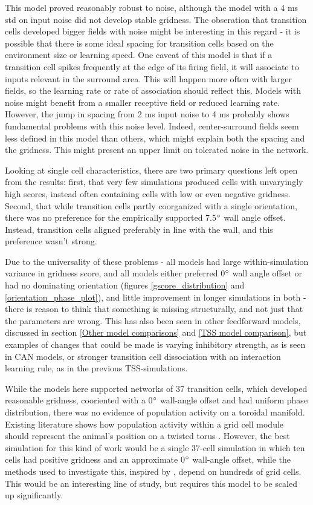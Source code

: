 \documentclass{article}
\begin{document}
    This model proved reasonably robust to noise, although the model with a 4 ms std on input noise did not develop stable gridness. The obseration that transition cells developed bigger fields with noise might be interesting in this regard - it is possible that there is some ideal spacing for transition cells based on the environment size or learning speed. One caveat of this model is that if a transition cell spikes frequently at the edge of its firing field, it will associate to inputs relevant in the surround area. This will happen more often with larger fields, so the learning rate or rate of association should reflect this. Models with noise might benefit from a smaller receptive field or reduced learning rate. However, the jump in spacing from 2 ms input noise to 4 ms probably shows fundamental problems with this noise level. Indeed, center-surround fields seem less defined in this model than others, which might explain both the spacing and the gridness. This might present an upper limit on tolerated noise in the network.

    Looking at single cell characteristics, there are two primary questions left open from the results: first, that very few simulations produced cells with unvaryingly high scores, instead often containing cells with low or even negative gridness. Second, that while transition cells partly coorganized with a single orientation, there was no preference for the empirically supported 7.5\(\degree\) wall angle offset. Instead, transition cells aligned preferably in line with the wall, and this preference wasn't strong.

    Due to the universality of these problems - all models had large within-simulation variance in gridness score, and all models either preferred 0\(\degree\) wall angle offset or had no dominating orientation (figures \ref{gscore_distribution} and \ref{orientation_phase_plot}), and little improvement in longer simulations in both - there is reason to think that something is missing structurally, and not just that the parameters are wrong. This has also been seen in other feedforward models, discussed in section \ref{Other model comparisons} and \ref{TSS model comparison}, but examples of changes that could be made is varying inhibitory strength, as is seen in CAN models, or stronger transition cell dissociation with an interaction learning rule, as in the previous TSS-simulations.

    While the models here supported networks of 37 transition cells, which developed reasonable gridness, cooriented with a 0\(\degree\) wall-angle offset and had uniform phase distribution, there was no evidence of population activity on a toroidal manifold. Existing literature shows how population activity within a grid cell module should represent the animal's position on a twisted torus \parencite{Gardner2022}. However, the best simulation for this kind of work would be a single 37-cell simulation in which ten cells had positive gridness and an approximate 0\(\degree\) wall-angle offset, while the methods used to investigate this, inspired by \cite{Gardner2022}, depend on hundreds of grid cells. This would be an interesting line of study, but requires this model to be scaled up significantly. 
\end{document}
